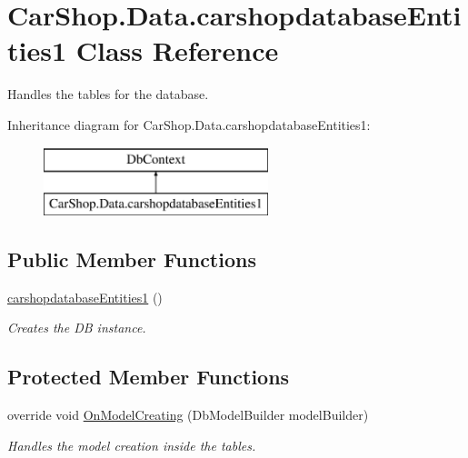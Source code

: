 \hypertarget{class_car_shop_1_1_data_1_1carshopdatabase_entities1}{}\section{Car\+Shop.\+Data.\+carshopdatabase\+Entities1 Class Reference}
\label{class_car_shop_1_1_data_1_1carshopdatabase_entities1}


Handles the tables for the database.  


Inheritance diagram for Car\+Shop.\+Data.\+carshopdatabase\+Entities1\+:\begin{figure}[H]
\begin{center}
\leavevmode
\includegraphics[height=2.000000cm]{class_car_shop_1_1_data_1_1carshopdatabase_entities1}
\end{center}
\end{figure}
\subsection*{Public Member Functions}
\begin{DoxyCompactItemize}
\item 
\mbox{\hyperlink{class_car_shop_1_1_data_1_1carshopdatabase_entities1_a4cda828061d80ffe58fcd1225253f4b3}{carshopdatabase\+Entities1}} ()
\begin{DoxyCompactList}\small\item\em Creates the DB instance. \end{DoxyCompactList}\end{DoxyCompactItemize}
\subsection*{Protected Member Functions}
\begin{DoxyCompactItemize}
\item 
override void \mbox{\hyperlink{class_car_shop_1_1_data_1_1carshopdatabase_entities1_a91e3bb5af22bafe43cd6ca4f35446819}{On\+Model\+Creating}} (Db\+Model\+Builder model\+Builder)
\begin{DoxyCompactList}\small\item\em Handles the model creation inside the tables. \end{DoxyCompactList}\end{DoxyCompactItemize}

